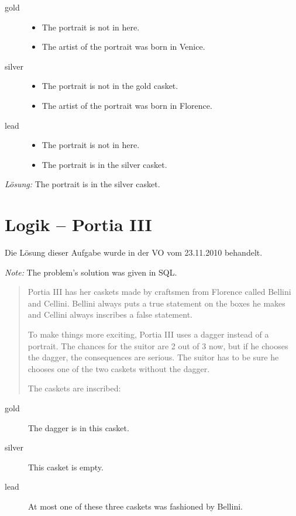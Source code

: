 \documentclass[11pt,a4paper]{article}
\theoremstyle{area}
\begin{document}
\begin{description}
  \item[gold]
    \begin{itemize}
      \item The portrait is not in here.
      \item The artist of the portrait was born in Venice.
    \end{itemize}

  \item[silver]
    \begin{itemize}
      \item The portrait is not in the gold casket.
      \item The artist of the portrait was born in Florence.
    \end{itemize}

  \item[lead]
    \begin{itemize}
      \item The portrait is not in here.
      \item The portrait is in the silver casket.
    \end{itemize}
\end{description}

\emph{Lösung:} The portrait is in the silver casket.

\section{Logik -- Portia III}

Die Lösung dieser Aufgabe wurde in der VO vom 23.11.2010 behandelt.

\emph{Note:} The problem's solution was given in SQL.

\begin{quote}
  Portia III has her caskets made by craftsmen from Florence called
  Bellini and Cellini. Bellini always puts a true statement on the boxes
  he makes and Cellini always inscribes a false statement.

  To make things more exciting, Portia III uses a dagger instead of a
  portrait. The chances for the suitor are 2 out of 3 now, but if he
  chooses the dagger, the consequences are serious. The suitor has to
  be sure he chooses one of the two caskets without the dagger.

  The caskets are inscribed:
\end{quote}

\begin{description}
  \item[gold] The dagger is in this casket.
  \item[silver] This casket is empty.
  \item[lead] At most one of these three caskets was fashioned by Bellini.
\end{description}
\end{document}

